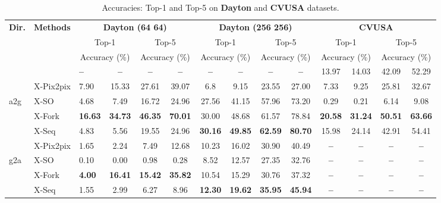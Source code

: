 \documentclass[times,twocolumn,final,authoryear]{elsarticle_modified}
\begin{document}
\begin{table*}[t]
\small
  \renewcommand{\arraystretch}{.7}
  \centering
  \caption{\small Accuracies: Top-1 and Top-5 on {\bf Dayton} and {\bf CVUSA} datasets.}
  \vspace{-10pt}
  \label{tab:accuracies}
    \begin{tabular*}{\textwidth}{l @{\extracolsep{\fill}} llccccccccccc}
        \toprule
               \multicolumn{1}{l}{\textbf{Dir.}} & \multicolumn{1}{l}{\textbf{Methods}} & \multicolumn{4}{c}{\textbf{Dayton (64  64)}} & \multicolumn{4}{c}{\textbf{Dayton (256  256)}} & \multicolumn{4}{c}{\textbf{CVUSA}}     \\
                \cmidrule(lr){3-6}
\cmidrule(lr){7-10} \cmidrule(lr){11-14}
        &  & \multicolumn{2}{c}{Top-1} & \multicolumn{2}{c}{Top-5} & \multicolumn{2}{c}{Top-1} & \multicolumn{2}{c}{Top-5} & \multicolumn{2}{c}{Top-1} & \multicolumn{2}{c}{Top-5} \\
        &  & \multicolumn{2}{c}{Accuracy (\%)} & \multicolumn{2}{c}{Accuracy (\%)} & \multicolumn{2}{c}{Accuracy (\%)} & \multicolumn{2}{c}{Accuracy (\%)} & \multicolumn{2}{c}{Accuracy (\%)} & \multicolumn{2}{c}{Accuracy (\%)} \\
          \midrule
      &   \cite{zhai2017crossview} & \textbf{--} & \textbf{--} & \textbf{--} & \textbf{--} & \textbf{--} & \textbf{--} & \textbf{--} & \textbf{--} & 13.97 & 14.03 & 42.09 & 52.29 \\
      &  X-Pix2pix  & 7.90 & 15.33 & 27.61 & 39.07 & 6.8 & 9.15 & 23.55 & 27.00 & 7.33 & 9.25 & 25.81 & 32.67 \\
a2g  &  X-SO & 4.68 & 7.49 & 16.72 & 24.96 & 27.56 & 41.15 & 57.96 & 73.20 & 0.29 & 0.21 & 6.14 & 9.08 \\
  &  X-Fork & \textbf{16.63} & \textbf{34.73} & \textbf{46.35} & \textbf{70.01} & 30.00 & 48.68 & 61.57 & 78.84 & \textbf{20.58} & \textbf{31.24} & \textbf{50.51} & \textbf{63.66}\\
  &  X-Seq & 4.83 & 5.56 & 19.55 & 24.96 & \textbf{30.16} & \textbf{49.85} & \textbf{62.59} & \textbf{80.70} & 15.98 & 24.14 & 42.91 & 54.41 \\
    \midrule
    &    X-Pix2pix  & 1.65 & 2.24 & 7.49 & 12.68 & 10.23 & 16.02 & 30.90 & 40.49 & \textbf{--} & \textbf{--} & \textbf{--} & \textbf{--} \\
    g2a  &  X-SO & 0.10 & 0.00 &  0.98 & 0.28 & 8.52 & 12.57 & 27.35 & 32.76 &\textbf{--} & \textbf{--} & \textbf{--} & \textbf{--}\\
 & X-Fork & \textbf{4.00} & \textbf{16.41} & \textbf{15.42} & \textbf{35.82} & 10.54 & 15.29 & 30.76 & 37.32 & \textbf{--} & \textbf{--} & \textbf{--} & \textbf{--}\\
  &  X-Seq & 1.55 & 2.99 & 6.27 & 8.96 & \textbf{12.30} & \textbf{19.62} & \textbf{35.95} & \textbf{45.94} & \textbf{--} & \textbf{--} & \textbf{--} & \textbf{--} \\
        \bottomrule
\end{tabular*}
      \vspace{-10pt}
\end{table*}
\end{document}
